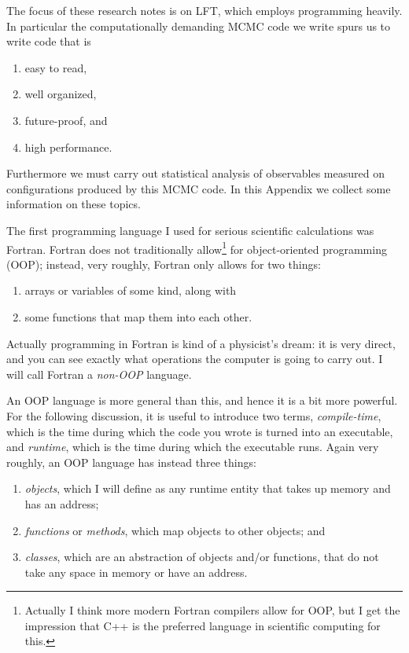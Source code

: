 The focus of these research notes is on LFT, which employs programming heavily.
In particular the computationally demanding MCMC code we write spurs us to
write code that is
\begin{enumerate}
  \item easy to read,
  \item well organized,
  \item future-proof, and
  \item high performance.
\end{enumerate}
Furthermore we must carry out statistical analysis of observables measured on
configurations produced by this MCMC code. In this Appendix we collect
some information on these topics.


The first programming language I used for serious scientific calculations
was Fortran. Fortran does not traditionally 
allow\footnote{Actually I think more modern Fortran compilers 
allow for OOP, but I get the impression that C++ is the preferred language
in scientific computing for this.} for object-oriented programming (OOP); 
instead, very roughly, Fortran only
allows for two things:
\begin{enumerate}
  \item arrays or variables of some kind, along with 
  \item some functions that map them into each other.
\end{enumerate}
Actually programming in Fortran is kind
of a physicist's dream: it is very direct, and you can see exactly what
operations the computer is going to carry out. I will call Fortran
a {\it non-OOP} language.

An OOP language is more general than this, and hence it is a bit more powerful.
For the following discussion, it is useful to introduce two terms,
{\it compile-time}, which is the time during which the code you wrote
is turned into an executable, and {\it runtime}, which is the time during
which the executable runs.
Again very roughly, an OOP language has instead three things:
\begin{enumerate}
  \item {\it objects}, which I will define as any runtime entity that 
        takes up memory and has an address;
  \item {\it functions} or {\it methods}, which map objects to other
        objects; and
  \item {\it classes}, which are an abstraction of objects and/or functions,
        that do not take any space in memory or have an address.
\end{enumerate}

